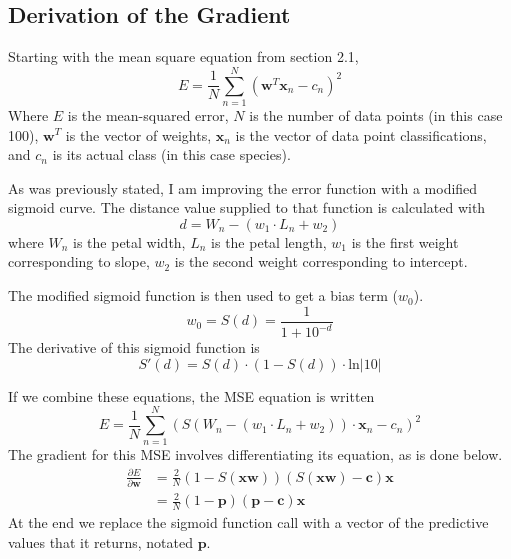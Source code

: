 \documentclass[letterpaper]{article}
\begin{document}
\subsection{Derivation of the Gradient}

Starting with the mean square equation from section 2.1,
\begin{equation*}
E = \frac{1}{N}\sum_{n=1}^N\left(\boldsymbol{w}^T\boldsymbol{x}_n-c_n\right)^2
\end{equation*}
Where $E$ is the mean-squared error, $N$ is the number of data points (in this
case 100), $\boldsymbol{w}^T$ is the vector of weights, $\boldsymbol{x}_n$ is
the vector of data point classifications, and $c_n$ is its actual class (in
this case species).

As was previously stated, I am improving the error function with a modified
sigmoid curve. The distance value supplied to that function is calculated with
\begin{equation*}
d = W_n - (w_1 \cdot L_n + w_2)
\end{equation*}
where $W_n$ is the petal width, $L_n$ is the petal length, $w_1$ is the first
weight corresponding to slope, $w_2$ is the second weight corresponding to
intercept.

The modified sigmoid function is then used to get a bias term ($w_0$).
\begin{equation*}
w_0 = S(d) = \frac{1}{1+10^{-d}}
\end{equation*}
The derivative of this sigmoid function is
\begin{equation*}
S'(d) = S(d)\cdot(1-S(d))\cdot\text{ln}|10|
\end{equation*}

If we combine these equations, the MSE equation is written
\begin{equation*}
E = \frac{1}{N}\sum_{n=1}^N\left(S(W_n - (w_1 \cdot L_n + w_2))\cdot\boldsymbol{x}_n-c_n\right)^2
\end{equation*}
The gradient for this MSE involves differentiating its equation, as is done below.
\begin{equation*}
\begin{split}
\frac{\partial E}{\partial\boldsymbol{w}} &= \frac{2}{N}(1-S(\boldsymbol{x}\boldsymbol{w}))(S(\boldsymbol{x}\boldsymbol{w})-\boldsymbol{c})\boldsymbol{x}\\
&= \frac{2}{N}(1-\boldsymbol{p})(\boldsymbol{p}-\boldsymbol{c})\boldsymbol{x}
\end{split}
\end{equation*}
At the end we replace the sigmoid function call with a vector of the predictive
values that it returns, notated $\boldsymbol{p}$.
\end{document}
